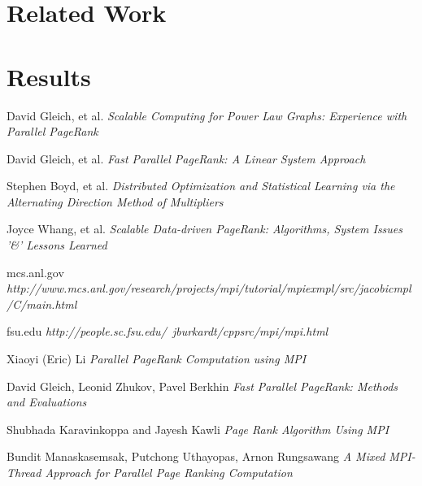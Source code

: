 \documentclass[letterpaper,12pt,onecolumn]{article}
\begin{document}
\section{Related Work}


\section{Results}

\begin{thebibliography}{1}

 David Gleich, et al. {\em Scalable Computing for Power Law Graphs: Experience with Parallel PageRank}

 David Gleich, et al. {\em Fast Parallel PageRank: A Linear System Approach} 

 Stephen Boyd, et al. {\em Distributed Optimization and Statistical Learning via the Alternating Direction Method of Multipliers} 

 Joyce Whang, et al. {\em Scalable Data-driven PageRank: Algorithms, System Issues '\&' Lessons Learned}
 
  mcs.anl.gov {\em http://www.mcs.anl.gov/research/projects/mpi/tutorial/mpiexmpl/src/jacobicmpl/C/main.html}
 
  fsu.edu {\em http://people.sc.fsu.edu/~jburkardt/cppsrc/mpi/mpi.html}

  Xiaoyi (Eric) Li  {\em Parallel PageRank Computation using MPI}

  David Gleich, Leonid Zhukov, Pavel Berkhin  {\em Fast Parallel PageRank: Methods and Evaluations}

  Shubhada Karavinkoppa and Jayesh Kawli  {\em Page Rank Algorithm Using MPI}

  Bundit Manaskasemsak, Putchong Uthayopas, Arnon Rungsawang {\em A Mixed MPI-Thread Approach for Parallel Page Ranking Computation}

\end{thebibliography}
\end{document}
